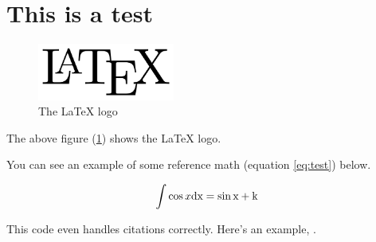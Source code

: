 \documentclass{article}
\begin{document}
\section{This is a test}

\begin{figure}
	\includegraphics[width=0.4\textwidth]{test.png}
	\caption{The LaTeX logo}
	\label{fig:latex}
\end{figure}

The above figure (\ref{fig:latex}) shows the LaTeX logo.

You can see an example of some reference math (equation \ref{eq:test}) below.

\begin{equation}\label{eq:test}
	\int \cos x \rm d x = \sin x + k
\end{equation}

This code even handles citations correctly. Here's an example, \cite{Lilley:2009zz}.
\end{document}
